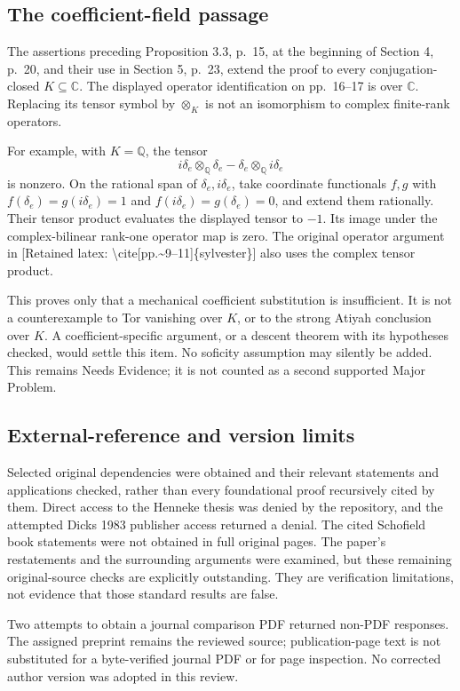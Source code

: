 \documentclass[10pt]{article}
\begin{document}
\subsection*{The coefficient-field passage}
The assertions preceding Proposition 3.3, p. 15, at the beginning of Section 4, p. 20, and their use in Section 5, p. 23, extend the proof to every conjugation-closed \(K\subseteq\mathbb C\). The displayed operator identification on pp. 16–17 is over \(\mathbb C\). Replacing its tensor symbol by \(\otimes_K\) is not an isomorphism to complex finite-rank operators.\par
For example, with \(K=\mathbb Q\), the tensor \[i\delta_e\otimes_{\mathbb Q}\delta_e-
 \delta_e\otimes_{\mathbb Q}i\delta_e\] is nonzero. On the rational span of \(\delta_e,i\delta_e\), take coordinate functionals \(f,g\) with \(f(\delta_e)=g(i\delta_e)=1\) and \(f(i\delta_e)=g(\delta_e)=0\), and extend them rationally. Their tensor product evaluates the displayed tensor to \(-1\). Its image under the complex-bilinear rank-one operator map is zero. The original operator argument in [Retained latex: \textbackslash{}cite[pp.\textasciitilde{}9--11]\{sylvester\}] also uses the complex tensor product.\par
This proves only that a mechanical coefficient substitution is insufficient. It is not a counterexample to Tor vanishing over \(K\), or to the strong Atiyah conclusion over \(K\). A coefficient-specific argument, or a descent theorem with its hypotheses checked, would settle this item. No soficity assumption may silently be added. This remains Needs Evidence; it is not counted as a second supported Major Problem.\par
\subsection*{External-reference and version limits}
Selected original dependencies were obtained and their relevant statements and applications checked, rather than every foundational proof recursively cited by them. Direct access to the Henneke thesis was denied by the repository, and the attempted Dicks 1983 publisher access returned a denial. The cited Schofield book statements were not obtained in full original pages. The paper’s restatements and the surrounding arguments were examined, but these remaining original-source checks are explicitly outstanding. They are verification limitations, not evidence that those standard results are false.\par
Two attempts to obtain a journal comparison PDF returned non-PDF responses. The assigned preprint remains the reviewed source; publication-page text is not substituted for a byte-verified journal PDF or for page inspection. No corrected author version was adopted in this review.\par
\end{document}
